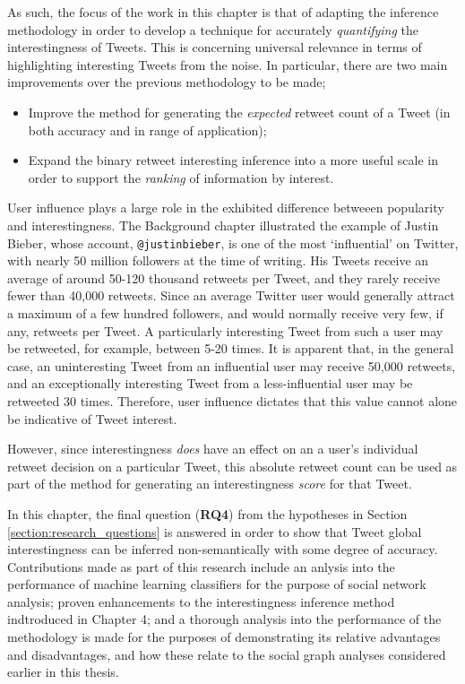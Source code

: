 As such, the focus of the work in this chapter is that of adapting the inference methodology in order to develop a technique for accurately \textit{quantifying} the interestingness of Tweets. This is concerning universal relevance in terms of highlighting interesting Tweets from the noise. In particular, there are two main improvements over the previous methodology to be made;
\begin{itemize}
    \item Improve the method for generating the \textit{expected} retweet count of a Tweet (in both accuracy and in range of application);
    \item Expand the binary retweet interesting inference into a more useful scale in order to support the \textit{ranking} of information by interest.
\end{itemize}

User influence plays a large role in the exhibited difference betweeen popularity and interestingness. The Background chapter illustrated the example of Justin Bieber, whose account, \texttt{@justinbieber}, is one of the most `influential' on Twitter, with nearly 50 million followers at the time of writing. His Tweets receive an average of around 50-120 thousand retweets per Tweet, and they rarely receive fewer than 40,000 retweets. Since an average Twitter user would generally attract a maximum of a few hundred followers, and would normally receive very few, if any, retweets per Tweet. A particularly interesting Tweet from such a user may be retweeted, for example, between 5-20 times. It is apparent that, in the general case, an uninteresting Tweet from an influential user may receive 50,000 retweets, and an exceptionally interesting Tweet from a less-influential user may be retweeted 30 times. Therefore, user influence dictates that this value cannot alone be indicative of Tweet interest.

However, since interestingness \textit{does} have an effect on an a user's individual retweet decision on a particular Tweet, this absolute retweet count can be used as part of the method for generating an interestingness \textit{score} for that Tweet.

In this chapter, the final question (\textbf{RQ4}) from the hypotheses in Section \ref{section:research_questions} is answered in order to show that Tweet global interestingness can be inferred non-semantically with some degree of accuracy. Contributions made as part of this research include an anlysis into the performance of machine learning classifiers for the purpose of social network analysis; proven enhancements to the interestingness inference method indtroduced in Chapter 4; and a thorough analysis into the performance of the methodology is made for the purposes of demonstrating its relative advantages and disadvantages, and how these relate to the social graph analyses considered earlier in this thesis. 


